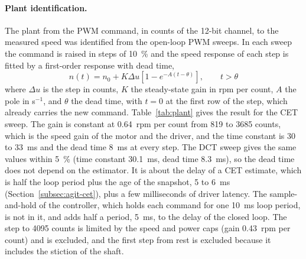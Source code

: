 \paragraph{Plant identification.}
The plant from the PWM command, in counts of the 12-bit channel, to the measured speed was identified from the open-loop PWM sweeps. In each sweep the command is raised in steps of 10~\% and the speed response of each step is fitted by a first-order response with dead time,
\begin{equation}
    n(t) = n_0 + K \Delta u \left[ 1 - e^{-A (t - \theta)} \right], \qquad t > \theta
    \label{eq:plant}
\end{equation}
where $\Delta u$ is the step in counts, $K$ the steady-state gain in rpm per count, $A$ the pole in s$^{-1}$, and $\theta$ the dead time, with $t = 0$ at the first row of the step, which already carries the new command. Table~\ref{tab:plant} gives the result for the CET sweep. The gain is constant at 0.64~rpm per count from 819 to 3685 counts, which is the speed gain of the motor and the driver, and the time constant is 30 to 33~ms and the dead time 8~ms at every step. The DCT sweep gives the same values within 5~\% (time constant 30.1~ms, dead time 8.3~ms), so the dead time does not depend on the estimator. It is about the delay of a CET estimate, which is half the loop period plus the age of the snapshot, 5 to 6~ms (Section~\ref{subsec:agit-cet}), plus a few milliseconds of driver latency. The sample-and-hold of the controller, which holds each command for one 10~ms loop period, is not in it, and adds half a period, 5~ms, to the delay of the closed loop. The step to 4095 counts is limited by the speed and power caps (gain 0.43~rpm per count) and is excluded, and the first step from rest is excluded because it includes the stiction of the shaft.

